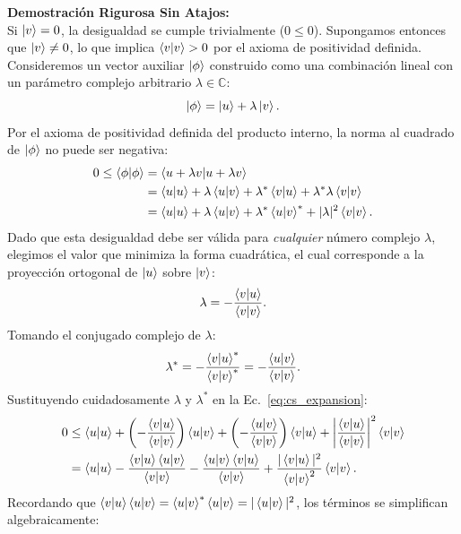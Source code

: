 \textbf{Demostración Rigurosa Sin Atajos:}\\
Si $\ket{v} = 0$, la desigualdad se cumple trivialmente ($0 \le 0$). Supongamos entonces que $\ket{v} \neq 0$, lo que implica $\braket{v}{v} > 0$ por el axioma de positividad definida. Consideremos un vector auxiliar $\ket{\phi}$ construido como una combinación lineal con un parámetro complejo arbitrario $\lambda \in \mathbb{C}$:
\begin{equation}
    \ket{\phi} = \ket{u} + \lambda\ket{v}.
\end{equation}
Por el axioma de positividad definida del producto interno, la norma al cuadrado de $\ket{\phi}$ no puede ser negativa:
\begin{align}
    0 \le \braket{\phi}{\phi} &= \braket{u + \lambda v}{u + \lambda v} \nonumber\\
    &= \braket{u}{u} + \lambda\braket{u}{v} + \lambda^*\braket{v}{u} + \lambda^*\lambda\braket{v}{v} \nonumber\\
    &= \braket{u}{u} + \lambda\braket{u}{v} + \lambda^*\braket{u}{v}^* + |\lambda|^2\braket{v}{v}.
    \label{eq:cs_expansion}
\end{align}
Dado que esta desigualdad debe ser válida para \textit{cualquier} número complejo $\lambda$, elegimos el valor que minimiza la forma cuadrática, el cual corresponde a la proyección ortogonal de $\ket{u}$ sobre $\ket{v}$:
\begin{equation}
    \lambda = -\frac{\braket{v}{u}}{\braket{v}{v}}.
    \label{eq:optimal_lambda}
\end{equation}
Tomando el conjugado complejo de $\lambda$:
\begin{equation}
    \lambda^* = -\frac{\braket{v}{u}^*}{\braket{v}{v}^*} = -\frac{\braket{u}{v}}{\braket{v}{v}}.
\end{equation}
Sustituyendo cuidadosamente $\lambda$ y $\lambda^*$ en la Ec.~\eqref{eq:cs_expansion}:
\begin{align}
    0 &\le \braket{u}{u} + \left(-\frac{\braket{v}{u}}{\braket{v}{v}}\right)\braket{u}{v} + \left(-\frac{\braket{u}{v}}{\braket{v}{v}}\right)\braket{v}{u} + \left|\frac{\braket{v}{u}}{\braket{v}{v}}\right|^2 \braket{v}{v} \nonumber\\
    &= \braket{u}{u} - \frac{\braket{v}{u}\braket{u}{v}}{\braket{v}{v}} - \frac{\braket{u}{v}\braket{v}{u}}{\braket{v}{v}} + \frac{|\braket{v}{u}|^2}{\braket{v}{v}^2}\braket{v}{v}.
\end{align}
Recordando que $\braket{v}{u}\braket{u}{v} = \braket{u}{v}^*\braket{u}{v} = |\braket{u}{v}|^2$, los términos se simplifican algebraicamente:
